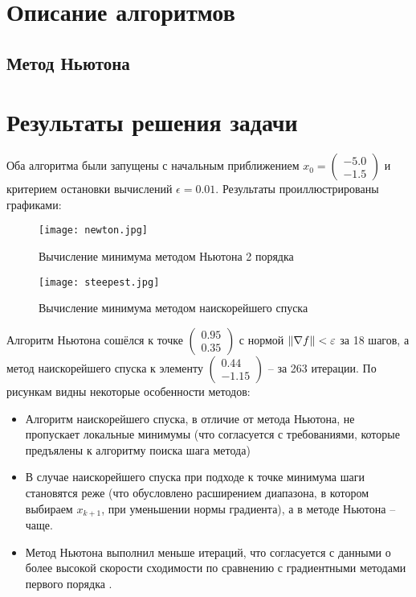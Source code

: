 \documentclass[main.tex]{subfiles}
\begin{document}
\section{Описание алгоритмов}

\subsection{Метод Ньютона}

\section{Результаты решения задачи}
Оба алгоритма были запущены с начальным приближением $x_0=\begin{pmatrix}-5.0\\-1.5\end{pmatrix}$ и критерием остановки вычислений $\epsilon = 0.01$. Результаты проиллюстрированы графиками:
\begin{figure}[H]
	\centering \texttt{[image: newton.jpg]}
	\caption{Вычисление минимума методом Ньютона 2 порядка}
	\label{im:newton}
\end{figure}
\begin{figure}[h]
	\centering \texttt{[image: steepest.jpg]}
	\caption{Вычисление минимума методом наискорейшего спуска}
	\label{im:steepest}
\end{figure}

Алгоритм Ньютона сошёлся к точке $\begin{pmatrix}0.95\\0.35\end{pmatrix}$ с нормой $\left\lVert\nabla f\right\rVert < \varepsilon$ за 18 шагов, а метод наискорейшего спуска к элементу $\begin{pmatrix}0.44\\-1.15\end{pmatrix}$ -- за 263 итерации. По рисункам видны некоторые особенности методов:
\begin{itemize}
	\item Алгоритм наискорейшего спуска, в отличие от метода Ньютона, не пропускает локальные минимумы (что согласуется с требованиями, которые предъялены к алгоритму поиска шага метода)
	\item В случае наискорейшего спуска при подходе к точке минимума шаги становятся реже (что обусловлено расширением диапазона, в котором выбираем $x_{k+1}$, при уменьшении нормы градиента), а в методе Ньютона -- чаще.
	\item Метод Ньютона выполнил меньше итераций, что согласуется с данными о более высокой скорости сходимости по сравнению с градиентными методами первого порядка \cite{boldirev}.
\end{itemize}
\end{document}
